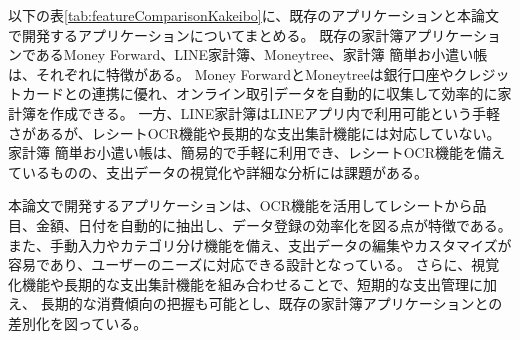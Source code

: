 \documentclass[main]{subfiles}
\begin{document}


以下の表\ref{tab:featureComparisonKakeibo}に、既存のアプリケーションと本論文で開発するアプリケーションについてまとめる。
既存の家計簿アプリケーションであるMoney Forward、LINE家計簿、Moneytree、家計簿 簡単お小遣い帳は、それぞれに特徴がある。
Money ForwardとMoneytreeは銀行口座やクレジットカードとの連携に優れ、オンライン取引データを自動的に収集して効率的に家計簿を作成できる。
一方、LINE家計簿はLINEアプリ内で利用可能という手軽さがあるが、レシートOCR機能や長期的な支出集計機能には対応していない。
家計簿 簡単お小遣い帳は、簡易的で手軽に利用でき、レシートOCR機能を備えているものの、支出データの視覚化や詳細な分析には課題がある。



本論文で開発するアプリケーションは、OCR機能を活用してレシートから品目、金額、日付を自動的に抽出し、データ登録の効率化を図る点が特徴である。
また、手動入力やカテゴリ分け機能を備え、支出データの編集やカスタマイズが容易であり、ユーザーのニーズに対応できる設計となっている。
さらに、視覚化機能や長期的な支出集計機能を組み合わせることで、短期的な支出管理に加え、
長期的な消費傾向の把握も可能とし、既存の家計簿アプリケーションとの差別化を図っている。
\end{document}
